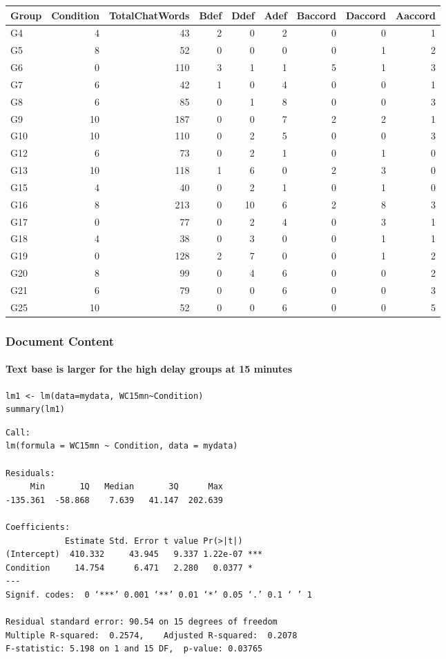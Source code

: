 \documentclass[10pt]{article}
\begin{document}
{\scriptsize
\begin{center}
\begin{tabular}{lrrrrrrrr}
Group & Condition & TotalChatWords & Bdef & Ddef & Adef & Baccord & Daccord & Aaccord\\
\hline
G4 & 4 & 43 & 2 & 0 & 2 & 0 & 0 & 1\\
G5 & 8 & 52 & 0 & 0 & 0 & 0 & 1 & 2\\
G6 & 0 & 110 & 3 & 1 & 1 & 5 & 1 & 3\\
G7 & 6 & 42 & 1 & 0 & 4 & 0 & 0 & 1\\
G8 & 6 & 85 & 0 & 1 & 8 & 0 & 0 & 3\\
G9 & 10 & 187 & 0 & 0 & 7 & 2 & 2 & 1\\
G10 & 10 & 110 & 0 & 2 & 5 & 0 & 0 & 3\\
G12 & 6 & 73 & 0 & 2 & 1 & 0 & 1 & 0\\
G13 & 10 & 118 & 1 & 6 & 0 & 2 & 3 & 0\\
G15 & 4 & 40 & 0 & 2 & 1 & 0 & 1 & 0\\
G16 & 8 & 213 & 0 & 10 & 6 & 2 & 8 & 3\\
G17 & 0 & 77 & 0 & 2 & 4 & 0 & 3 & 1\\
G18 & 4 & 38 & 0 & 3 & 0 & 0 & 1 & 1\\
G19 & 0 & 128 & 2 & 7 & 0 & 0 & 1 & 2\\
G20 & 8 & 99 & 0 & 4 & 6 & 0 & 0 & 2\\
G21 & 6 & 79 & 0 & 0 & 6 & 0 & 0 & 3\\
G25 & 10 & 52 & 0 & 0 & 6 & 0 & 0 & 5\\
\end{tabular}
\end{center}
}

\subsubsection{Document Content}
\label{sec-2-2-1}

\paragraph*{Text base is larger for the high delay groups at 15 minutes}
\label{sec-2-2-1-1}

\begin{verbatim}
lm1 <- lm(data=mydata, WC15mn~Condition)
summary(lm1)
\end{verbatim}

\begin{verbatim}
Call:
lm(formula = WC15mn ~ Condition, data = mydata)

Residuals:
     Min       1Q   Median       3Q      Max 
-135.361  -58.868    7.639   41.147  202.639 

Coefficients:
            Estimate Std. Error t value Pr(>|t|)    
(Intercept)  410.332     43.945   9.337 1.22e-07 ***
Condition     14.754      6.471   2.280   0.0377 *  
---
Signif. codes:  0 ‘***’ 0.001 ‘**’ 0.01 ‘*’ 0.05 ‘.’ 0.1 ‘ ’ 1

Residual standard error: 90.54 on 15 degrees of freedom
Multiple R-squared:  0.2574,	Adjusted R-squared:  0.2078 
F-statistic: 5.198 on 1 and 15 DF,  p-value: 0.03765
\end{verbatim}
\end{document}

